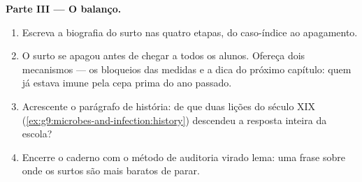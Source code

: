 \begin{problem}
\medskip\noindent\textbf{Parte III --- O balanço.}
\begin{enumerate}[resume]
  \item Escreva a biografia do surto nas quatro etapas, do
        caso-índice ao apagamento.
  \item O surto se apagou antes de chegar a todos os alunos.
        Ofereça dois mecanismos --- os bloqueios das medidas
        e a dica do próximo capítulo: quem já estava imune
        pela cepa prima do ano passado.
  \item Acrescente o parágrafo de história: de que duas
        lições do século XIX
        (\cref{ex:g9:microbes-and-infection:history})
        descendeu a resposta inteira da escola?
  \item Encerre o caderno com o método de auditoria virado
        lema: uma frase sobre onde os surtos são mais baratos
        de parar.
\end{enumerate}
\end{problem}
